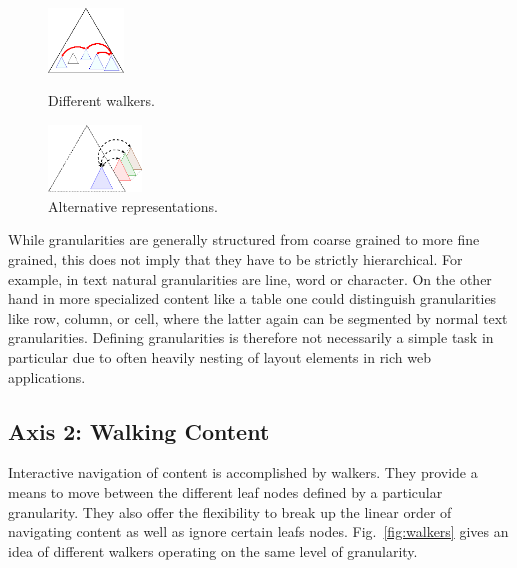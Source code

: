 \documentclass{sig-alternate}
\begin{document}
\begin{figure}[t!]
\begin{minipage}{.33\linewidth}
\begin{center}
    \EndAccSupp{}
    \qquad
    \includegraphics[width=2cm]{images/walker2}
    \EndAccSupp{}
    \caption{Different walkers.}
    \label{fig:walkers}
  \end{center}
\end{minipage}
  \begin{minipage}{.33\linewidth}
\begin{center}
    \leavevmode
    \includegraphics[width=2.5cm]{images/substructure1}
    \EndAccSupp{}
    \caption{Alternative representations.}
    \label{fig:alt}
  \end{center}
\end{minipage}
\end{figure}

While granularities are generally structured from coarse grained to more fine
grained, this does not imply that they have to be strictly hierarchical. For
example, in text natural granularities are line, word or character. On the other
hand in more specialized content like a table one could distinguish
granularities like row, column, or cell, where the latter again can be segmented
by normal text granularities.  Defining granularities is therefore not
necessarily a simple task in particular due to often heavily nesting of layout
elements in rich web applications.

\subsection{Axis 2: Walking Content}
\label{sec:ax2}

Interactive navigation of content is accomplished by walkers.  They provide a
means to move between the different leaf nodes defined by a particular
granularity. They also offer the flexibility to break up the linear order of
navigating content as well as ignore certain leafs nodes. Fig.~\ref{fig:walkers} gives
an idea of different walkers operating on the same level of granularity.
\end{document}

